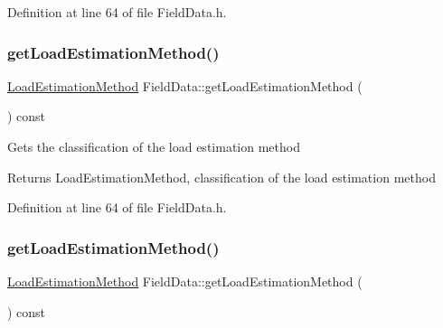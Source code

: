 Definition at line 64 of file Field\+Data.\+h.

\mbox{\label{class_field_data_ae213fa76dd005d7fd251ef26beecd311}} 
\subsubsection{\texorpdfstring{get\+Load\+Estimation\+Method()}{getLoadEstimationMethod()}\hspace{0.1cm}{\footnotesize\ttfamily [2/3]}}
{\footnotesize\ttfamily \hyperlink{class_field_data_a424e89914ba5684c01bb269dbe3312fd}{Load\+Estimation\+Method} Field\+Data\+::get\+Load\+Estimation\+Method (\begin{DoxyParamCaption}{ }\end{DoxyParamCaption}) const\hspace{0.3cm}{\ttfamily [inline]}}

Gets the classification of the load estimation method

\begin{DoxyReturn}{Returns}
Load\+Estimation\+Method, classification of the load estimation method 
\end{DoxyReturn}


Definition at line 64 of file Field\+Data.\+h.

\mbox{\label{class_field_data_ae213fa76dd005d7fd251ef26beecd311}} 
\subsubsection{\texorpdfstring{get\+Load\+Estimation\+Method()}{getLoadEstimationMethod()}\hspace{0.1cm}{\footnotesize\ttfamily [3/3]}}
{\footnotesize\ttfamily \hyperlink{class_field_data_a424e89914ba5684c01bb269dbe3312fd}{Load\+Estimation\+Method} Field\+Data\+::get\+Load\+Estimation\+Method (\begin{DoxyParamCaption}{ }\end{DoxyParamCaption}) const\hspace{0.3cm}{\ttfamily [inline]}}

